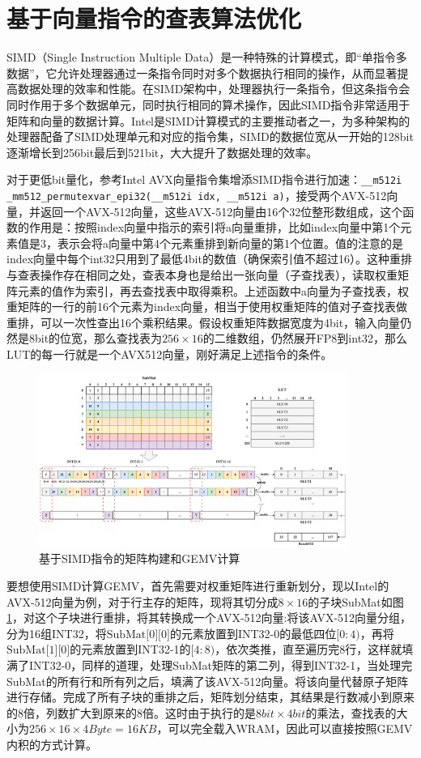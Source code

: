 \section{基于向量指令的查表算法优化}
SIMD（Single Instruction Multiple Data）是一种特殊的计算模式，即“单指令多数据”，它允许处理器通过一条指令同时对多个数据执行相同的操作，从而显著提高数据处理的效率和性能。在SIMD架构中，处理器执行一条指令，但这条指令会同时作用于多个数据单元，同时执行相同的算术操作，因此SIMD指令非常适用于矩阵和向量的数据计算。Intel是SIMD计算模式的主要推动者之一，为多种架构的处理器配备了SIMD处理单元和对应的指令集\cite{IntelAVX}，SIMD的数据位宽从一开始的128bit逐渐增长到256bit最后到521bit，大大提升了数据处理的效率。

对于更低bit量化，参考Intel AVX向量指令集增添SIMD指令进行加速：\verb|__m512i _mm512_permutexvar_epi32(__m512i idx, __m512i a)|，接受两个AVX-512向量，并返回一个AVX-512向量，这些AVX-512向量由16个32位整形数组成，这个函数的作用是：按照index向量中指示的索引将a向量重排，比如index向量中第1个元素值是3，表示会将a向量中第4个元素重排到新向量的第1个位置。值的注意的是index向量中每个int32只用到了最低4bit的数值（确保索引值不超过16）。这种重排与查表操作存在相同之处，查表本身也是给出一张向量（子查找表），读取权重矩阵元素的值作为索引，再去查找表中取得乘积。上述函数中a向量为子查找表，权重矩阵的一行的前16个元素为index向量，相当于使用权重矩阵的值对子查找表做重排，可以一次性查出16个乘积结果。假设权重矩阵数据宽度为4bit，输入向量仍然是8bit的位宽，那么查找表为$256\times 16$的二维数组，仍然展开FP8到int32，那么LUT的每一行就是一个AVX512向量，刚好满足上述指令的条件。

\begin{figure}[!htbp]
	\centering
    \includegraphics[width=0.9\textwidth]{figures/SIMD.pdf}
	\caption{基于SIMD指令的矩阵构建和GEMV计算}
    \label{SIMD}
\end{figure}

要想使用SIMD计算GEMV，首先需要对权重矩阵进行重新划分，现以Intel的AVX-512向量为例，对于行主存的矩阵，现将其切分成$8\times 16$的子块SubMat如图\ref{SIMD}，对这个子块进行重排，将其转换成一个AVX-512向量:将该AVX-512向量分组，分为16组INT32，将$\text{SubMat[0][0]}$的元素放置到INT32-0的最低四位$[0:4)$，再将$\text{SubMat[1][0]}$的元素放置到INT32-1的$[4:8)$，依次类推，直至遍历完8行，这样就填满了INT32-0，同样的道理，处理SubMat矩阵的第二列，得到INT32-1，当处理完SubMat的所有行和所有列之后，填满了该AVX-512向量。将该向量代替原子矩阵进行存储。完成了所有子块的重排之后，矩阵划分结束，其结果是行数减小到原来的8倍，列数扩大到原来的8倍。这时由于执行的是$8bit\times 4bit$的乘法，查找表的大小为$256\times 16\times 4Byte=16KB$，可以完全载入WRAM，因此可以直接按照GEMV内积的方式计算。

